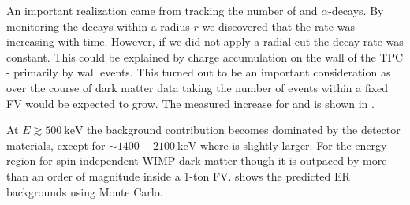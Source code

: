 An important realization came from tracking the number of  and  $\alpha$-decays.  By monitoring the
decays within a radius $r$ we discovered that the rate was increasing with time.  However, if we did not apply a radial cut the decay rate
was constant.  This could be explained by charge accumulation on the wall of the TPC - primarily by wall events.  This turned out to be an
important consideration as over the course of dark matter data taking the number of events within a fixed FV would be expected to
grow.  The measured increase for  and  is shown in .


At $E \gtrsim 500\ \mathrm{keV}$ the background contribution becomes dominated by the detector materials, except for
${\sim} 1400-2100\ \mathrm{keV}$ where  is slightly larger.  For the energy region for spin-independent WIMP dark matter
though it is outpaced by more than an order of magnitude inside a 1-ton FV.   shows the predicted ER
backgrounds using Monte Carlo.

